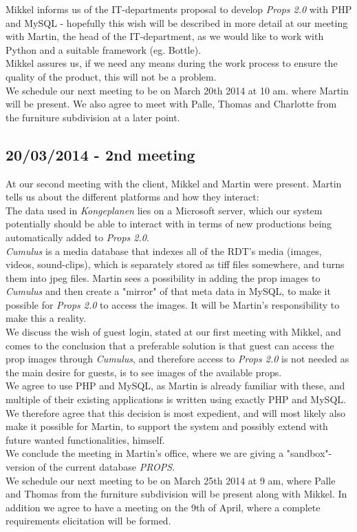 \documentclass[12pt]{article}
\begin{document}
Mikkel informs us of the IT-departments proposal to develop \textit{Props 2.0} with PHP and MySQL - hopefully this wish will be described in more detail at our meeting with Martin, the head of the IT-department, as we would like to work with Python and a suitable framework (eg. Bottle). \\
Mikkel assures us, if we need any means during the work process to ensure the quality of the product, this will not be a problem.\\
We schedule our next meeting to be on March 20th 2014 at 10 am. where Martin will be present. We also agree to meet with Palle, Thomas and Charlotte from the furniture subdivision at a later point.
\subsection*{20/03/2014 - 2nd meeting}
At our second meeting with the client, Mikkel and Martin were present. Martin tells us about the different platforms and how they interact:\\
The data used in \textit{Kongeplanen} lies on a Microsoft server, which our system potentially should be able to interact with in terms of new productions being automatically added to \textit{Props 2.0}. \\
\textit{Cumulus} is a media database that indexes all of the RDT's media (images, videos, sound-clips), which is separately  stored as tiff files somewhere, and turns them into jpeg files. Martin sees a possibility in adding the prop images to \textit{Cumulus} and then create a "mirror" of that meta data in MySQL, to make it possible for \textit{Props 2.0} to access the images. It will be Martin's responsibility to make this a reality. \\
We discuss the wish of guest login, stated at our first meeting with Mikkel, and comes to the conclusion that a preferable solution is that guest can access the prop images through \textit{Cumulus}, and therefore access to \textit{Props 2.0} is not needed as the main desire for guests, is to see images of the available props.\\
We agree to use PHP and MySQL, as Martin is already familiar with these, and multiple of their existing applications is written using exactly PHP and MySQL. We therefore agree that this decision is most expedient, and will most likely also make it possible for Martin, to support the system and possibly extend with future wanted functionalities, himself. \\
We conclude the meeting in Martin's office, where we are giving a "sandbox"-version of the current database \textit{PROPS}. \\
We schedule our next meeting to be on March 25th 2014 at 9 am, where Palle and Thomas from the furniture subdivision will be present along with Mikkel. In addition we agree to have a meeting on the 9th of April, where a complete requirements elicitation will be formed. 
\end{document}
